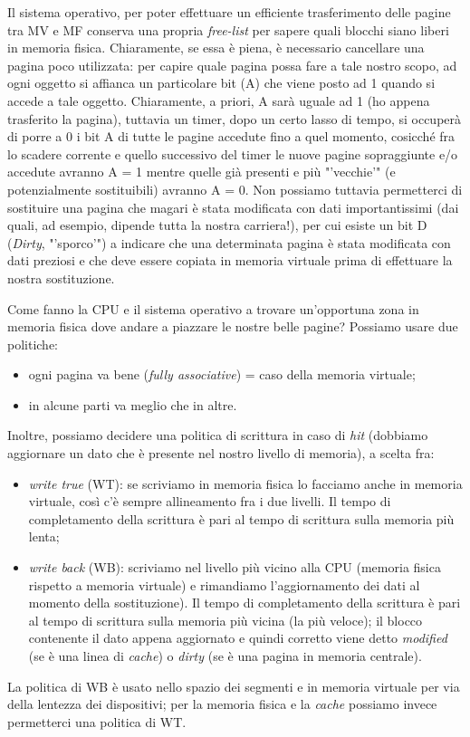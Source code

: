 Il sistema operativo, per poter effettuare un efficiente trasferimento delle pagine tra MV e MF conserva una propria \textit{free-list} per sapere quali blocchi siano liberi in memoria fisica. Chiaramente, se essa è piena, è necessario cancellare una pagina poco utilizzata: per capire quale pagina possa fare a tale nostro scopo, ad ogni oggetto si affianca un particolare bit (A) che viene posto ad 1 quando si accede a tale oggetto. Chiaramente, a priori, A sarà uguale ad 1 (ho appena trasferito la pagina), tuttavia un timer, dopo un certo lasso di tempo, si occuperà di porre a 0 i bit A di tutte le pagine accedute fino a quel momento, cosicché fra lo scadere corrente e quello successivo del timer le nuove pagine sopraggiunte e/o accedute avranno A = 1 mentre quelle già presenti e più "'vecchie'" (e potenzialmente sostituibili) avranno A = 0.
Non possiamo tuttavia permetterci di sostituire una pagina che magari è stata modificata con dati importantissimi (dai quali, ad esempio, dipende tutta la nostra carriera!), per cui esiste un bit D (\textit{Dirty}, "'sporco'") a indicare che una determinata pagina è stata modificata con dati preziosi e che deve essere copiata in memoria virtuale prima di effettuare la nostra sostituzione.

Come fanno la CPU e il sistema operativo a trovare un'opportuna zona in memoria fisica dove andare a piazzare le nostre belle pagine? Possiamo usare due politiche:
\begin{itemize}
\item ogni pagina va bene (\textit{fully associative}) =  caso della memoria virtuale;
\item in alcune parti va meglio che in altre.
\end{itemize}



Inoltre, possiamo decidere una politica di scrittura in caso di \textit{hit} (dobbiamo aggiornare un dato che è presente nel nostro livello di memoria), a scelta fra:
\begin{itemize}
\item \textit{write true} (WT): se scriviamo in memoria fisica lo facciamo anche in memoria virtuale, così c'è sempre allineamento fra i due livelli. Il tempo di completamento della scrittura è pari al tempo di scrittura sulla memoria più lenta;
\item \textit{write back} (WB): scriviamo nel livello più vicino alla CPU (memoria fisica rispetto a memoria virtuale) e rimandiamo l'aggiornamento dei dati al momento della sostituzione). Il tempo di completamento della scrittura è pari al tempo di scrittura sulla memoria più vicina (la più veloce); il blocco contenente il dato appena
aggiornato e quindi corretto viene detto \textit{modified} (se è una linea di \textit{cache}) o \textit{dirty} (se è una pagina in memoria centrale).
\end{itemize}
La politica di WB è usato nello spazio dei segmenti e in memoria virtuale per via della lentezza dei dispositivi; per la memoria fisica e la \textit{cache} possiamo invece permetterci una politica di WT.


